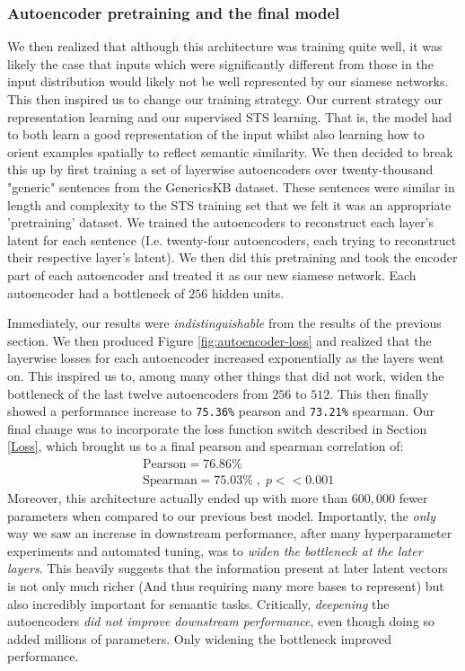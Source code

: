 \documentclass{article}
\begin{document}
\subsubsection{Autoencoder pretraining and the final model}
We then realized that although this architecture was training quite well, it was likely the case that inputs which were significantly different from those in the input distribution would likely not be well represented by our siamese networks. This then inspired us to change our training strategy. Our current strategy  our representation learning and our supervised STS learning. That is, the model had to both learn a good representation of the input whilst also learning how to orient examples spatially to reflect semantic similarity. We then decided to break this up by first training a set of layerwise autoencoders over twenty-thousand "generic" sentences from the GenericsKB \cite{bhakthavatsalam2020genericskbknowledgebasegeneric} dataset. These sentences were similar in length and complexity to the STS training set that we felt it was an appropriate 'pretraining' dataset. We trained the autoencoders to reconstruct each layer's latent for each sentence (I.e. twenty-four autoencoders, each trying to reconstruct their respective layer's latent). We then did this pretraining and took the encoder part of each autoencoder and treated it as our new siamese network. Each autoencoder had a bottleneck of $256$ hidden units.

Immediately, our results were \textit{indistinguishable} from the results of the previous section. We then produced Figure \ref{fig:autoencoder-loss} and realized that the layerwise losses for each autoencoder increased exponentially as the layers went on. This inspired us to, among many other things that did not work, widen the bottleneck of the last twelve autoencoders from $256$ to $512$. This then finally showed a performance increase to \verb|75.36%| pearson and \verb|73.21%| spearman. Our final change was to incorporate the loss function switch described in Section \ref{Loss}, which brought us to a final pearson and spearman correlation of:
\begin{align*}
    &\text{Pearson} = 76.86\%\\
    &\text{Spearman} = 75.03\%\;,\; p << 0.001
\end{align*}
Moreover, this architecture actually ended up with more than $600,000$ fewer parameters when compared to our previous best model. Importantly, the \textit{only} way we saw an increase in downstream performance, after many hyperparameter experiments and automated tuning, was to \textit{widen the bottleneck at the later layers}. This heavily suggests that the information present at later latent vectors is not only much richer (And thus requiring many more bases to represent) but also incredibly important for semantic tasks. Critically, \textit{deepening} the autoencoders \textit{did not improve downstream performance}, even though doing so added millions of parameters. Only widening the bottleneck improved performance.
\end{document}
